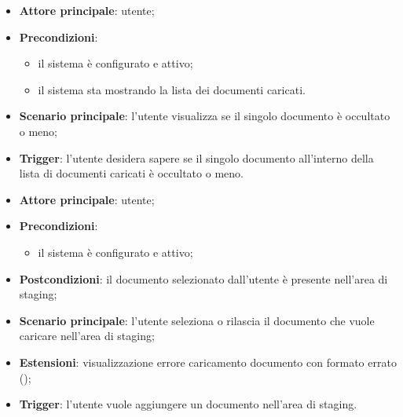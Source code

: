 \documentclass[10pt, a4paper]{article}
\begin{document}
    \begin{itemize}
        \item \textbf{Attore principale}: utente;
        \item \textbf{Precondizioni}:
            \begin{itemize}
                \item il sistema è configurato e attivo;
                \item il sistema sta mostrando la lista dei documenti caricati.
            \end{itemize}
        \item \textbf{Scenario principale}: l'utente visualizza se il singolo documento è occultato o meno;
        \item \textbf{Trigger}: l’utente desidera sapere se il singolo documento all’interno della lista di documenti caricati è occultato o meno.
    \end{itemize}
    
    \begin{itemize}
        \item \textbf{Attore principale}: utente;
        \item \textbf{Precondizioni}:
            \begin{itemize}
                \item il sistema è configurato e attivo;
            \end{itemize}
        \item \textbf{Postcondizioni}: il documento selezionato dall’utente è presente nell’area di staging;
        \item \textbf{Scenario principale}: l’utente seleziona o rilascia il documento che vuole caricare nell’area di staging;
        \item \textbf{Estensioni}: visualizzazione errore caricamento documento con formato errato ();
        \item \textbf{Trigger}: l’utente vuole aggiungere un documento nell’area di staging.
    \end{itemize}
\end{document}
